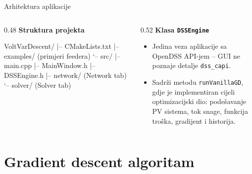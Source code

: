 \documentclass[10pt,aspectratio=169]{beamer}
\begin{document}
\begin{frame}[fragile]{Arhitektura aplikacije}
  \begin{columns}[T,onlytextwidth]
    \begin{column}{0.48\textwidth}
      \textbf{Struktura projekta}
      {\scriptsize
      \begin{semiverbatim}
VoltVarDescent/
|-- CMakeLists.txt
|-- examples/   (primjeri feedera)
`-- src/
    |-- main.cpp
    |-- MainWindow.h
    |-- DSSEngine.h
    |-- network/  (Network tab)
    `-- solver/   (Solver tab)
      \end{semiverbatim}
      }
    \end{column}
    \begin{column}{0.52\textwidth}
      \textbf{Klasa \texttt{DSSEngine}}
      \begin{itemize}
        \item Jedina veza aplikacije sa OpenDSS API-jem -- GUI ne poznaje detalje \texttt{dss\_capi}.
        \item Sadrži metodu \texttt{runVanillaGD}, gdje je implementiran cijeli optimizacijski dio: podešavanje PV sistema, tok snage, funkcija troška, gradijent i historija.
      \end{itemize}
    \end{column}
  \end{columns}
\end{frame}

\section{Gradient descent algoritam}
\end{document}
